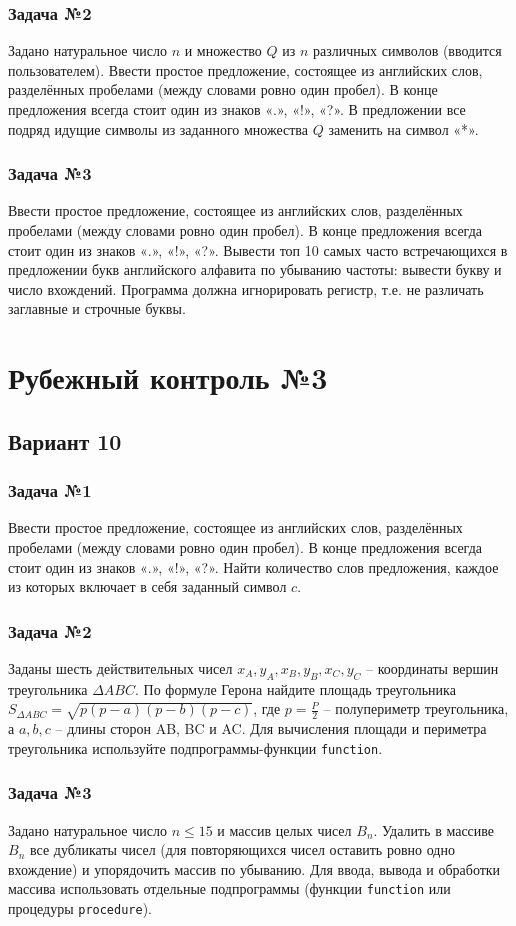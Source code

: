 \documentclass[12pt,a5paper,landscape]{report}
\begin{document}
\subsubsection*{Задача №2}
Задано натуральное число $n$ и множество $Q$ из $n$ различных символов (вводится пользователем). Ввести простое предложение, состоящее из английских слов, разделённых пробелами (между словами ровно один пробел). В конце предложения всегда стоит один из знаков «.», «!», «?». В предложении все подряд идущие символы из заданного множества $Q$ заменить на символ «*».
\subsubsection*{Задача №3}
Ввести простое предложение, состоящее из английских слов, разделённых пробелами (между словами ровно один пробел). В конце предложения всегда стоит один из знаков «.», «!», «?». Вывести топ 10 самых часто встречающихся в предложении букв английского алфавита по убыванию частоты: вывести букву и число вхождений. Программа должна игнорировать регистр, т.е. не различать заглавные и строчные буквы.

\section*{Рубежный контроль №3}
\subsection*{Вариант 10}
\subsubsection*{Задача №1}
Ввести простое предложение, состоящее из английских слов, разделённых пробелами (между словами ровно один пробел). В конце предложения всегда стоит один из знаков «.», «!», «?». Найти количество слов предложения, каждое из которых   включает в себя заданный символ $c$.
\subsubsection*{Задача №2}
Заданы шесть действительных чисел $x_A, y_A, x_B, y_B, x_C, y_C$ -- координаты вершин треугольника $\Delta ABC$. По формуле Герона найдите площадь треугольника $S_{\Delta ABC} = \sqrt { p (p-a) (p-b) (p-c)}$, где $p = \frac{P}{2}$ -- полупериметр треугольника, а $a,b,c$ -- длины сторон AB, BC и AC. Для вычисления площади и периметра треугольника используйте подпрограммы-функции \texttt{function}.
\subsubsection*{Задача №3}
Задано натуральное число $n \le 15$ и массив целых чисел $B_n$. Удалить в массиве $B_n$ все дубликаты чисел (для повторяющихся чисел оставить ровно одно вхождение) и упорядочить массив по убыванию. Для ввода, вывода и обработки массива использовать отдельные подпрограммы (функции \texttt{function} или процедуры \texttt{procedure}).
\end{document}

